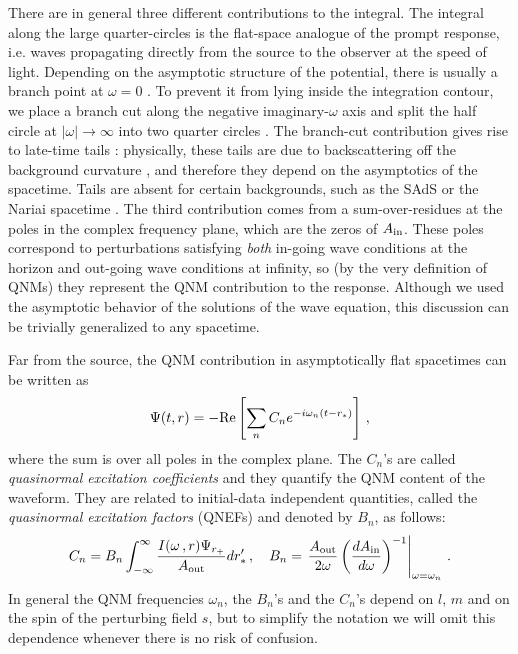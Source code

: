 \documentclass[]{iopart}
\def\be{\begin{equation}}
\def\ee{\end{equation}}
\begin{document}
%
There are in general three different contributions to the integral. The
integral along the large quarter-circles is the flat-space analogue of the
prompt response, i.e. waves propagating directly from the source to the
observer at the speed of light. Depending on the asymptotic structure of the
potential, there is usually a branch point at $\omega=0$ \cite{Ching:1995tj}.
To prevent it from lying inside the integration contour, we place a branch cut
along the negative imaginary-$\omega$ axis and split the half circle at
$|\omega|\rightarrow \infty$ into two quarter circles
\cite{nollertthesis,Jensen:1985in,Ching:1994bd}. The branch-cut contribution
gives rise to late-time tails \cite{price,Leaver:1986gd,Ching:1994bd}:
physically, these tails are due to backscattering off the background curvature
\cite{price}, and therefore they depend on the asymptotics of the
spacetime. Tails are absent for certain backgrounds, such as the SAdS
\cite{Horowitz:1999jd} or the Nariai spacetime \cite{Casals:2009zh}.
%
The third contribution comes from a sum-over-residues at the poles in the
complex frequency plane, which are the zeros of $A_{\rm in}$.  These poles
correspond to perturbations satisfying {\it both} in-going wave conditions at
the horizon and out-going wave conditions at infinity, so (by the very
definition of QNMs) they represent the QNM contribution to the
response. Although we used the asymptotic behavior of the solutions of the
wave equation, this discussion can be trivially generalized to any spacetime.

Far from the source, the QNM contribution in asymptotically flat spacetimes
can be written as \cite{Andersson:1995zk,Berti:2006wq}
%
\be
\Psi(t,r) =
-{\rm Re} \left[ \sum_{n}C_n e^{-i\omega_n(t-r_*)} \right]\,,
\label{init2} 
\ee
%
where the sum is over all poles in the complex plane.  The $C_n$'s are called
{\it quasinormal excitation coefficients} and they quantify the QNM content of
the waveform. They are related to initial-data independent quantities, called
the {\it quasinormal excitation factors} (QNEFs) and denoted by $B_n$, as
follows:
%
\be
\label{excfactors} 
C_n=B_n \int_{-\infty}^{\infty} \frac{
I(\omega\,,r)\Psi_{r_+}}{A_{\rm out}}dr_*' \,,\quad
B_n= 
\left. \frac{A_{\rm out}}{2\omega} \left (\frac{dA_{\rm
in}}{d\omega}\right)^{-1} \right|_{\omega=\omega_{n}} \,.
\ee
%
In general the QNM frequencies $\omega_n$, the $B_n$'s and the $C_n$'s depend
on $l$, $m$ and on the spin of the perturbing field $s$, but to simplify the
notation we will omit this dependence whenever there is no risk of confusion.
\end{document}
